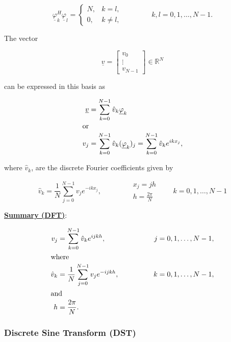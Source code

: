 \documentclass[11pt]{article}
\begin{document}
\begin{equation*}
  \underline{\varphi}_k^H \underline{\varphi}_l = 
  \begin{cases}
    N, & k=l, \\
    0, & k \not= l,
  \end{cases}
  \qquad \qquad k,l=0,1,\ldots,N-1.
\end{equation*}
    
The vector 

\begin{equation*}
  \underline{v} = 
  \begin{bmatrix}
    v_0 \\
    \vdots \\
    v_{N-1}
  \end{bmatrix}
  \in \mathbb{R}^N
\end{equation*}

can be expressed in this basis as

\begin{align*}
  \underline{v} &= \sum_{k=0}^{N-1} \hat{v}_k \underline{\varphi}_k \\
  \intertext{or}
  v_j &= \sum_{k=0}^{N-1} \hat{v}_k (\underline{\varphi}_k)_j = \sum_{k=0}^{N-1} \hat{v}_k e^{ik x_j},
\end{align*}

where $\hat{v}_k$, are the discrete Fourier coefficients given by

\begin{equation*}
  \hat{v}_k = \frac{1}{N} \sum_{j=0}^{N-1} v_j e^{-ik x_j}, \qquad \qquad 
  \begin{matrix}
    x_j = j h \\
    h = \frac{2\pi}{N}
  \end{matrix}
  \qquad k=0,1,\ldots,N-1
\end{equation*}
  
\underline{\textbf{Summary (DFT)}}:

\begin{alignat*}{2}
  v_j &= \sum_{k=0}^{N-1} \hat{v}_k e^{ijkh}, & \qquad \qquad j&=0,1,\ldots,N-1, \\
  \intertext{where}
  \hat{v}_k &= \frac{1}{N} \sum_{j=0}^{N-1} v_j e^{-ijkh}, & \qquad \qquad k&=0,1,\ldots,N-1, \\
  \intertext{and}
  h &= \frac{2 \pi}{N}.
\end{alignat*}


\subsubsection{Discrete Sine Transform (DST)}
\end{document}

